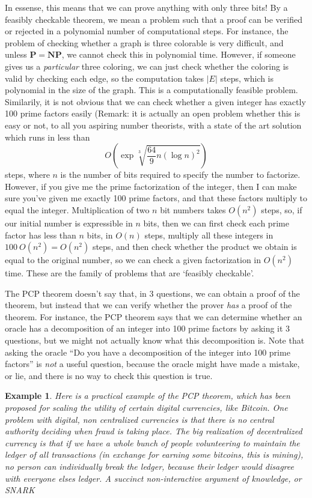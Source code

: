 \documentclass{article}
\theoremstyle{plain}
\newtheorem*{example}{Example}
\theoremstyle{definition}
\begin{document}
In essense, this means that we can prove anything with only three bits! By a feasibly checkable theorem, we mean a problem such that a proof can be verified or rejected in a polynomial number of computational steps. For instance, the problem of checking whether a graph is three colorable is very difficult, and unless $\mathbf{P} = \mathbf{NP}$, we cannot check this in polynomial time. However, if someone gives us a {\it particular} three coloring, we can just check whether the coloring is valid by checking each edge, so the computation takes $|E|$ steps, which is polynomial in the size of the graph. This is a computationally feasible problem. Similarily, it is not obvious that we can check whether a given integer has exactly 100 prime factors easily (Remark: it is actually an open problem whether this is easy or not, to all you aspiring number theorists, with a state of the art solution which runs in less than
%
\[ O \left(\exp \sqrt[3]{\frac{64}{9} n (\log n)^2 } \right) \]
%
steps, where $n$ is the number of bits required to specify the number to factorize. However, if you give me the prime factorization of the integer, then I can make sure you've given me exactly 100 prime factors, and that these factors multiply to equal the integer. Multiplication of two $n$ bit numbers takes $O(n^2)$ steps, so, if our initial number is expressible in $n$ bits, then we can first check each prime factor has less than $n$ bits, in $O(n)$ steps, multiply all these integers in $100\ O(n^2) = O(n^2)$ steps, and then check whether the product we obtain is equal to the original number, so we can check a given factorization in $O(n^2)$ time. These are the family of problems that are `feasibly checkable'.

The PCP theorem doesn't say that, in 3 questions, we can obtain a proof of the theorem, but instead that we can verify whether the prover {\it has} a proof of the theorem. For instance, the PCP theorem says that we can determine whether an oracle has a decomposition of an integer into 100 prime factors by asking it 3 questions, but we might not actually know what this decomposition is. Note that asking the oracle ``Do you have a decomposition of the integer into 100 prime factors'' is {\it not} a useful question, because the oracle might have made a mistake, or lie, and there is no way to check this question is true.

\begin{example}
    Here is a practical example of the PCP theorem, which has been proposed for scaling the utility of certain digital currencies, like Bitcoin. One problem with digital, non centralized currencies is that there is no central authority deciding when fraud is taking place. The big realization of decentralized currency is that if we have a whole bunch of people volunteering to maintain the ledger of all transactions (in exchange for earning some bitcoins, this is mining), no person can individually break the ledger, because their ledger would disagree with everyone elses ledger. A {\it succinct non-interactive argument of knowledge}, or SNARK
\end{example}
\end{document}
